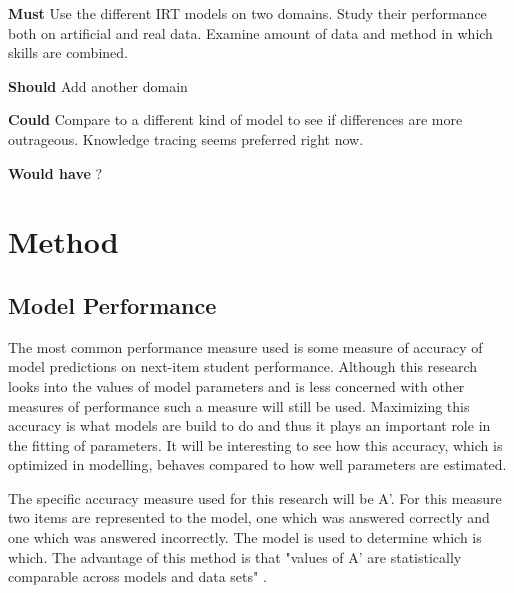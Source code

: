 \documentclass{article}
\begin{document}
{\bf Must} Use the different IRT models on two domains. Study their performance both on artificial and real data. Examine amount of data and method in which skills are combined.

{\bf Should} Add another domain

{\bf Could} Compare to a different kind of model to see if differences are more outrageous. Knowledge tracing seems preferred right now.

{\bf Would have} ?

\section{Method}




\subsection{Model Performance}

\label{sec:perf}
The most common performance measure used is some measure of accuracy of model predictions on next-item student performance. Although this research looks into the values of model parameters and is less concerned with other measures of performance such a measure will still be used. Maximizing this accuracy is what models are build to do and thus it plays an important role in the fitting of parameters. It will be interesting to see how this accuracy, which is optimized in modelling, behaves compared to how well parameters are estimated.

The specific accuracy measure used for this research will be A'. For this measure two items are represented to the model, one which was answered correctly and one which was answered incorrectly. The model is used to determine which is which. The advantage of this method is that "values of A' are statistically comparable across models and data sets" \cite{modelreview}.

\begin{comment}
Since the learner models are also used as an approximation of how students learn and as such influence decisions made on what exercises are given to a student, what exercises are included in general and what topics require more attention, the validity of the specific parameters of the model need to taken into account. In this research external validity (e.g. see if the parameter settings seem realistic) is not the concern, but rather whether the found parameters are consistent over multiple trainings of the model and (in the case of generated data) whether the training algorithm recovers the used parameters correctly.
\end{comment}
\end{document}
